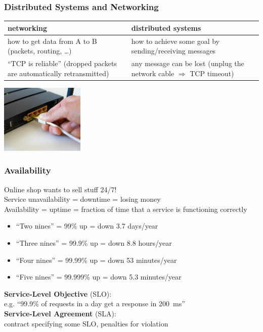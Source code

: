 \begin{frame}
    \label{s:networking2}
    \frametitle{Distributed Systems and Networking}
    \renewcommand{\arraystretch}{1.3}
    \begin{tabular}{p{5cm}|p{5cm}}
        \hline
        \textbf{networking} & \textbf{distributed systems} \\\hline
        how to get data from A to B \newline (packets, routing, \dots) & how to achieve some goal by sending/receiving messages \pause\\
        ``TCP is reliable'' \newline (dropped packets are automatically retransmitted) & any message can be lost \newline (unplug the network cable \newline$\Rightarrow$ TCP timeout) \\\hline
    \end{tabular}
    \begin{center}
        \includegraphics[width=4cm]{images/network-cable.jpg}
    \end{center}
\end{frame}
\label{l:networking2}

\begin{frame}
    \label{s:availability}
    \frametitle{Availability}
    Online shop wants to sell stuff 24/7! \\
    Service unavailability = downtime = losing money \\[1em]
    Availability = uptime = fraction of time that a service is functioning correctly
    \begin{itemize}
        \item ``Two nines'' = 99\% up = down 3.7 days/year
        \item ``Three nines'' = 99.9\% up = down 8.8 hours/year
        \item ``Four nines'' = 99.99\% up = down 53 minutes/year
        \item ``Five nines'' = 99.999\% up = down 5.3 minutes/year\\[1.5em]
    \end{itemize}\pause
    \textbf{Service-Level Objective} (SLO):\\ e.g. ``99.9\% of requests in a day get a response in 200~ms''\\[1em]
    \textbf{Service-Level Agreement} (SLA):\\ contract specifying some SLO, penalties for violation
\end{frame}
\label{l:availability}

